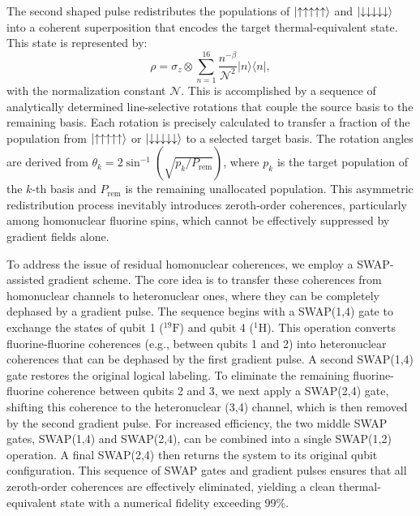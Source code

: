 \documentclass[aps,pra,twocolumn,superscriptaddress,preprintnumbers,amsmath,amssymb]{revtex4-2}
\begin{document}
The second shaped pulse redistributes the populations of $\ket{\uparrow\uparrow\uparrow\uparrow\uparrow}$ and $\ket{\downarrow\downarrow\downarrow\downarrow\downarrow}$ into a coherent superposition that encodes the target thermal-equivalent state. This state is represented by:
\begin{equation}
\rho = \sigma_z \otimes \sum_{n=1}^{16} \frac{n^{-\beta}}{\mathcal{N}^2} |n\rangle \langle n|,
\end{equation}
with the normalization constant $\mathcal{N}$.
This is accomplished by a sequence of analytically determined line-selective rotations that couple the source basis to the remaining basis. Each rotation is precisely calculated to transfer a fraction of the population from $\ket{\uparrow\uparrow\uparrow\uparrow\uparrow}$ or $\ket{\downarrow\downarrow\downarrow\downarrow\downarrow}$ to a selected target basis. The rotation angles are derived from $\theta_k = 2\sin^{-1}\left(\sqrt{p_k / P_{\mathrm{rem}}}\right)$, where $p_k$ is the target population of the $k$-th basis and $P_{\mathrm{rem}}$ is the remaining unallocated population.
This {asymmetric redistribution process inevitably introduces zeroth-order coherences}, particularly among homonuclear fluorine spins, which cannot be effectively suppressed by gradient fields alone.

To address the issue of residual homonuclear coherences, we employ a {SWAP-assisted gradient scheme}. The core idea is to transfer these coherences from homonuclear channels to heteronuclear ones, where they can be completely dephased by a gradient pulse.
The sequence begins with a {SWAP(1,4)} gate to exchange the states of qubit 1 ($^{19}\mathrm{F}$) and qubit 4 ($^{1}\mathrm{H}$). This operation converts fluorine-fluorine coherences (e.g., between qubits 1 and 2) into heteronuclear coherences that can be dephased by the first gradient pulse. A second {SWAP(1,4)} gate restores the original logical labeling. To eliminate the remaining fluorine-fluorine coherence between qubits 2 and 3, we next apply a {SWAP(2,4)} gate, shifting this coherence to the heteronuclear (3,4) channel, which is then removed by the second gradient pulse.
For increased efficiency, the two middle SWAP gates, {SWAP(1,4)} and {SWAP(2,4)}, can be combined into a single {SWAP(1,2)} operation. A final {SWAP(2,4)} then returns the system to its original qubit configuration. This sequence of SWAP gates and gradient pulses ensures that all zeroth-order coherences are effectively eliminated, yielding a clean thermal-equivalent state with a numerical fidelity exceeding 99\%. 
\end{document}
